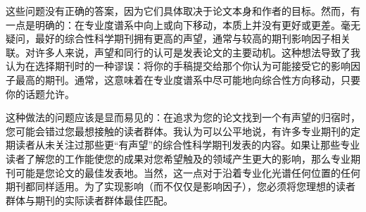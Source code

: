 这些问题没有正确的答案，因为它们具体取决于论文本身和作者的目标。然而，有一点是明确的：在专业度谱系中向上或向下移动，本质上并没有更好或更差。毫无疑问，最好的综合性科学期刊拥有更高的声望，通常与较高的期刊影响因子相关联。对许多人来说，声望和同行的认可是发表论文的主要动机。这种想法导致了我认为在选择期刊时的一种谬误：将你的手稿提交给那个你认为可能接受它的影响因子最高的期刊。通常，这意味着在专业度谱系中尽可能地向综合性方向移动，只要你的话题允许。

这种做法的问题应该是显而易见的：在追求为您的论文找到一个有声望的归宿时，您可能会错过您最想接触的读者群体。我认为可以公平地说，有许多专业期刊的定期读者从未关注过那些更“有声望”的综合性科学期刊发表的内容。如果让那些专业读者了解您的工作能使您的成果对您希望触及的领域产生更大的影响，那么专业期刊可能是您论文的最佳发表地。当然，这一点对于沿着专业化光谱任何位置的任何期刊都同样适用。为了实现影响（而不仅仅是影响因子），您必须将您理想的读者群体与期刊的实际读者群体最佳匹配。

